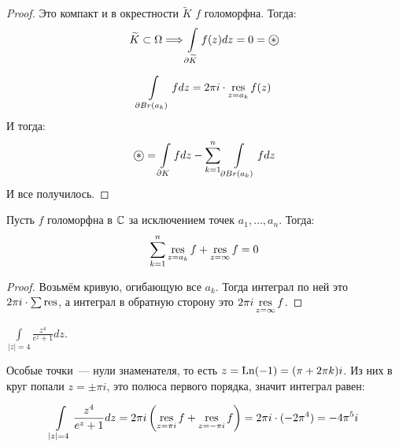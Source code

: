 \begin{proof}
    Это компакт и в окрестности $\widetilde{K}$ $f$ голоморфна. Тогда: 
    \begin{gather*}
        \widetilde{K} \subset \Omega \Longrightarrow \int\limits_{\partial \widetilde K} f(z) dz = 0 = \oast
    \end{gather*}

   \begin{gather*}
        \int\limits_{\partial Br(a_k)} f dz = 2 \pi i \cdot \operatorname*{res}\limits_{z = a_k} f(z)
   \end{gather*}
   И тогда: 
   \begin{gather*}
    \oast = \int\limits_{\partial K} fdz - \sum\limits_{k=1}^n \int\limits_{\partial Br(a_k)} f dz
   \end{gather*}
   И все получилось. 
\end{proof}

\begin{consequence}
    Пусть $f$ голоморфна в $\mathbb{C}$ за исключением точек
    $a_1, \ldots, a_n$. Тогда:
    \begin{gather*}
        \sum\limits_{k=1}^{n} \operatorname*{res}\limits_{z=a_k} f + \operatorname*{res}\limits_{z=\infty} f = 0
    \end{gather*} 
\end{consequence}

\begin{proof}
    Возьмём кривую, огибающую все $a_k$.
    Тогда интеграл по ней это $2\pi i \cdot \sum \operatorname*{res}$,
    а интеграл в обратную сторону это $2\pi i \operatorname*{res}\limits_{z=\infty} f$.
\end{proof}

\begin{example}
    $\int\limits_{|z|=4} \frac{z^4}{e^z+1}dz$.

    Особые точки~--- нули знаменателя, то есть
    $z = \operatorname{Ln}(-1) = (\pi + 2\pi k)i$.
    Из них в круг попали $z = \pm \pi i$,
    это полюса первого порядка,
    значит интеграл равен:

    \[
        \int\limits_{|z|=4} \frac{z^4}{e^z+1}dz
        = 2\pi i \left(\operatorname*{res}\limits_{z=\pi i} f + \operatorname*{res}\limits_{z=-\pi i} f\right)
        = 2\pi i \cdot (-2\pi^4) = -4\pi^5i
    \]
\end{example}

\newpage

